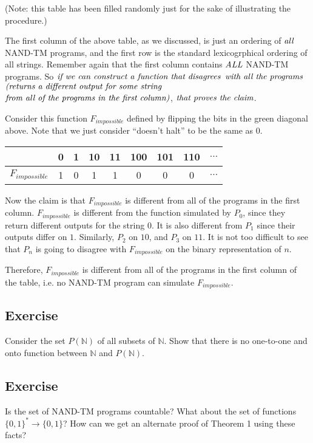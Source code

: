 \documentclass[11pt]{article}
\theoremstyle{definition}
\theoremstyle{remark}
\begin{document}
(Note: this table has been filled randomly just for the sake of illustrating the procedure.)

The first column of the above table, as we discussed, is just an ordering of $\emph{all}$ NAND-TM programs, and
the first row is the standard lexicogrphical ordering of all strings. Remember again that the first column contains
$\emph{ALL}$ NAND-TM programs. So $\emph{if we can construct a function that disagrees}$
$\emph{with all the programs}$ $\emph{(returns a different output for some
string}$
$\emph{from all of the programs in the
first column)}$, $\emph{that proves the claim}$.

Consider this function $F_{impossible}$ defined by flipping the bits in the green diagonal above.
Note that we just consider ``doesn't halt'' to be the same as 0.

\begin{center}
    \begin{tabular}{c|cccccccc}
        & 0 & 1 & 10 & 11 & 100 & 101 & 110 & $\dots$ \\ 
        \hline
        $F_{impossible}$ & \cellcolor{green!20}1 & \cellcolor{green!20}0 & \cellcolor{green!20}1 & \cellcolor{green!20}1
        &\cellcolor{green!20}0 & \cellcolor{green!20}0 & \cellcolor{green!20}0 & $\dots$
    \end{tabular}
\end{center}

Now the claim is that $F_{impossible}$ is different from all of the programs in the first column. $F_{impossible}$ is different from
the function simulated by
$P_0$, since they return different outputs for the string $0$. It is also different from $P_1$ since their outputs differ on $1$. 
Similarly, $P_2$ on $10$, and $P_3$ on $11$. It is not too difficult to see that $P_n$ is going to disagree with $F_{impossible}$ on the
binary representation of $n$.

Therefore, $F_{impossible}$ is different from all of the programs in the first column of the table, i.e.
no NAND-TM program can simulate $F_{impossible}$.

\subsection{Exercise}
Consider the set $P(\mathbb{N})$ of all subsets of $\mathbb{N}$. Show that there is no one-to-one and onto function between 
$\mathbb{N}$ and $P(\mathbb{N})$. 

\subsection{Exercise}
Is the set of NAND-TM programs countable? What about the set of functions $\{0,1\}^* \to \{0,1\}$? How can we get an alternate proof of Theorem 1 using these facts?
\end{document}
